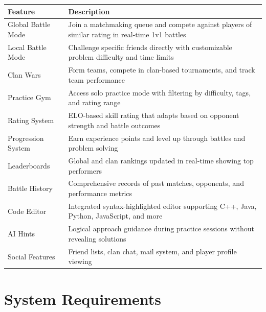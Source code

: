 \documentclass[12pt,a4paper]{article}
\begin{document}
\begin{longtable}{|p{3.5cm}|p{10cm}|}
\hline
\textbf{Feature} & \textbf{Description} \\
\hline
\endhead

Global Battle Mode & Join a matchmaking queue and compete against players of similar rating in real-time 1v1 battles \\
\hline

Local Battle Mode & Challenge specific friends directly with customizable problem difficulty and time limits \\
\hline

Clan Wars & Form teams, compete in clan-based tournaments, and track team performance \\
\hline

Practice Gym & Access solo practice mode with filtering by difficulty, tags, and rating range \\
\hline

Rating System & ELO-based skill rating that adapts based on opponent strength and battle outcomes \\
\hline

Progression System & Earn experience points and level up through battles and problem solving \\
\hline

Leaderboards & Global and clan rankings updated in real-time showing top performers \\
\hline

Battle History & Comprehensive records of past matches, opponents, and performance metrics \\
\hline

Code Editor & Integrated syntax-highlighted editor supporting C++, Java, Python, JavaScript, and more \\
\hline

AI Hints & Logical approach guidance during practice sessions without revealing solutions \\
\hline

Social Features & Friend lists, clan chat, mail system, and player profile viewing \\
\hline

\end{longtable}

\FloatBarrier

\section{System Requirements}
\end{document}
